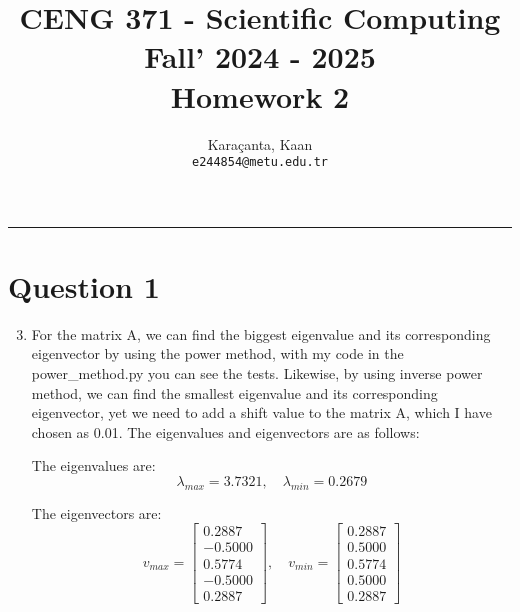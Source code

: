 \documentclass[11pt,a4paper, margin=1in]{article}
\author{
  Karaçanta, Kaan\\
  \texttt{e244854@metu.edu.tr}
}
\title{CENG 371 - Scientific Computing \\
Fall' 2024 - 2025 \\
Homework 2}
\date{}
\begin{document}
\maketitle

\noindent\rule{19cm}{1.2pt}


\section*{Question 1}

\begin{enumerate}
    \setcounter{enumi}{2}
    \item %
    For the matrix A, we can find the biggest eigenvalue and its corresponding eigenvector by using the power method, with my code in the power\_method.py you can see the tests. Likewise, by using inverse power method, we can find the smallest eigenvalue and its corresponding eigenvector, yet we need to add a shift value to the matrix A, which I have chosen as 0.01. The eigenvalues and eigenvectors are as follows:
    
    The eigenvalues are:
    \[
    \lambda_{max} = 3.7321, \quad \lambda_{min} = 0.2679
    \]

    The eigenvectors are:
    \[
    v_{max} = \begin{bmatrix} 0.2887 \\ -0.5000 \\ 0.5774 \\ -0.5000 \\ 0.2887 \end{bmatrix}, \quad v_{min} = \begin{bmatrix} 0.2887 \\ 0.5000 \\ 0.5774 \\ 0.5000 \\ 0.2887 \end{bmatrix}
    \]
    

\end{enumerate}
\end{document}
